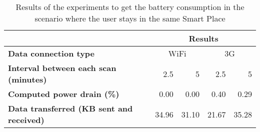 \begin{table}[]
\centering
\begin{tabular}{@{}|l|r|r|r|r|@{}}
\toprule
{\bf }                                        & \multicolumn{4}{c|}{{\bf Results}}                  \\ \midrule
{\bf Data connection type}                    & \multicolumn{2}{c|}{WiFi} & \multicolumn{2}{c|}{3G} \\ \midrule
{\bf Interval between each scan (minutes)}    & 2.5          & 5          & 2.5        & 5          \\ \midrule
{\bf Computed power drain (\%)}               & 0.00         & 0.00       & 0.40       & 0.29       \\ \midrule
{\bf Data transferred (KB sent and received)} & 34.96        & 31.10      & 21.67      & 35.28      \\ \bottomrule
\end{tabular}
\caption{Results of the experiments to get the battery consumption in the scenario where the user stays in the same Smart Place}
\label{tab:results_battery_stopped}
\end{table}
